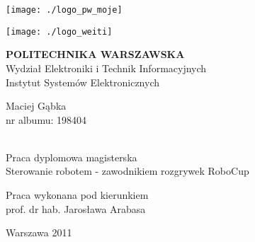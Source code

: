 \begin{titlepage}
\linespread{1.1}
\hspace{0.4cm}
 \begin{minipage}{0.4\textwidth}
	\begin{flushleft} 
	\texttt{[image: ./logo\_pw\_moje]}
	\end{flushleft}
\end{minipage}
\begin{minipage}{0.4\textwidth}
	\begin{flushright} 
	\texttt{[image: ./logo\_weiti]}
	\end{flushright}
\end{minipage}
\begin{flushleft}


\end{flushleft}
\vspace{0.1cm}
\begin{center}
{\textbf{\LARGE POLITECHNIKA WARSZAWSKA}}\\
\Large Wydział Elektroniki i Technik Informacyjnych\\
\Large Instytut Systemów Elektronicznych\\[2.5cm]
 \begin{minipage}{0.9\textwidth}
	\begin{center} 
	\Large
	Maciej Gąbka\\nr albumu: 198404
	\end{center}
\end{minipage}
\\[1.5cm]
{\Large Praca dyplomowa magisterska}\\
 \Huge Sterowanie robotem - zawodnikiem rozgrywek RoboCup\\[2.0cm]
\begin{flushleft} \large
\hspace{5.5cm}Praca wykonana pod kierunkiem \\ 
\hspace{5.5cm}prof. dr hab. Jarosława Arabasa
\end{flushleft}
\vfill
{\large Warszawa 2011}
\end{center}
\end{titlepage}
